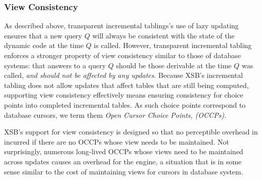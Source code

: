 \subsubsection{View Consistency} \label{sec:view-consistency}
%
As described above, transparent incremental tablings's use of lazy
updating ensures that a new query $Q$ will always be consistent with
the state of the dynamic code at the time $Q$ is called.  However,
transparent incremental tabling enforces a stronger property of view
consistency similar to those of database systems: that answers to a
query $Q$ should be those derivable at the time $Q$ was called, {\em
  and should not be affected by any updates}.
Because XSB's incremental tabling does not allow updates that affect
tables that are still being computed, supporting view consistency
effectively means ensuring consistency for choice points into
completed incremental tables.  As such choice points correspond to
database cursors, we term them {\em Open Cursor Choice Points,
  (OCCPs)}.

XSB's support for view consistency is designed so that no perceptible
overhead in incurred if there are no OCCPs whose view needs to be
maintained.  Not surprisingly, numerous long-lived OCCPs whose views
need to be maintained across updates causes an overhead for the
engine, a situation that is in some sense similar to the cost of
maintaining views for cursors in database system.

